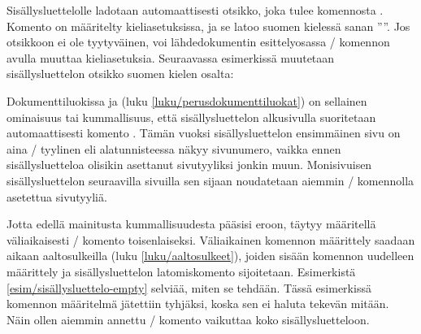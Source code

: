 \begin{koodilohkosis}
\setcounter{tocdepth}{0}
\end{koodilohkosis}

\noindent
Sisällysluettelolle ladotaan automaattisesti otsikko, joka tulee
komennosta . Komento on määritelty
kieliasetuksissa, ja se latoo suomen kielessä sanan ''\contentsname''.
Jos otsikkoon ei ole tyytyväinen, voi lähdedokumentin esittelyosassa
\-/ komennon avulla muuttaa kieliasetuksia. Seuraavassa
esimerkissä muutetaan sisällysluettelon otsikko suomen kielen osalta:

\begin{koodilohkosis}
\addto{\captionsfinnish}{
  \renewcommand{\contentsname}{Sisällysluettelo}
}
\end{koodilohkosis}

\noindent
Dokumenttiluokissa  ja  (luku
\ref{luku/perusdokumenttiluokat}) on sellainen ominaisuus tai
kummallisuus, että sisällysluettelon alkusivulla suoritetaan
automaattisesti komento . Tämän
vuoksi sisällysluettelon ensimmäinen sivu on aina \-/
tyylinen eli alatunnisteessa näkyy sivunumero, vaikka ennen
sisällysluetteloa olisikin asettanut sivutyyliksi jonkin muun.
Monisivuisen sisällysluettelon seuraavilla sivuilla sen sijaan
noudatetaan aiemmin \-/ komennolla asetettua
sivutyyliä.

\begin{esimerkki*}

\begin{koodilohko}
\pagestyle{empty}
{
  \renewcommand{\thispagestyle}[1]{} %
  \tableofcontents
}
\end{koodilohko}
  \caption{Sisällysluettelon sivutyylin muuttaminen kokonaan
    \-/ tyyliseksi. Komento  pitää
    määritellä väliaikaisesti uudestaan dokumenttiluokissa 
    ja }
  \label{esim/sisällysluettelo-empty}
\end{esimerkki*}

Jotta edellä mainitusta kummallisuudesta pääsisi eroon, täytyy
määritellä väliaikaisesti \-/ komento
toisenlaiseksi. Väliaikainen komennon määrittely saadaan aikaan
aaltosulkeilla (luku \ref{luku/aaltosulkeet}), joiden sisään komennon
uudelleen määrittely ja sisällysluettelon latomiskomento sijoitetaan.
Esimerkistä \ref{esim/sisällysluettelo-empty} selviää, miten se tehdään.
Tässä esimerkissä komennon määritelmä jätettiin tyhjäksi, koska sen ei
haluta tekevän mitään. Näin ollen aiemmin annettu \-/
komento vaikuttaa koko sisällysluetteloon.

